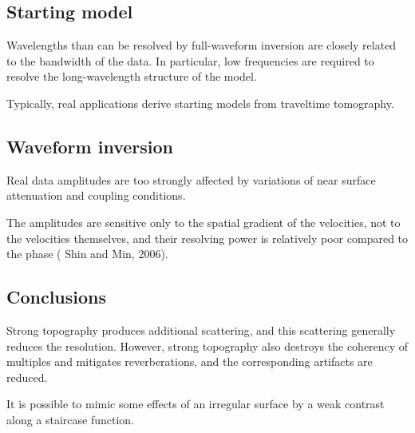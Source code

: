 \subsection{Starting model}
Wavelengths than can be resolved by full-waveform inversion are
closely related to the bandwidth of the data.
In particular, low frequencies are required to resolve
the long-wavelength structure of the model.

Typically, real applications derive starting models from traveltime tomography.

\subsection{Waveform inversion}
Real data amplitudes are too strongly affected by variations of
near surface attenuation and coupling conditions.

The amplitudes are sensitive only to the spatial gradient of the velocities,
not to the velocities themselves, and their resolving power is
relatively poor compared to the phase
( Shin and Min, 2006).

\subsection{Conclusions}
Strong topography produces additional scattering,
and this scattering generally reduces the resolution.
However, strong topography also destroys the coherency of multiples and
mitigates reverberations, and the corresponding artifacts are reduced.

It is possible to mimic some effects of an irregular surface by
a weak contrast along a staircase function.

